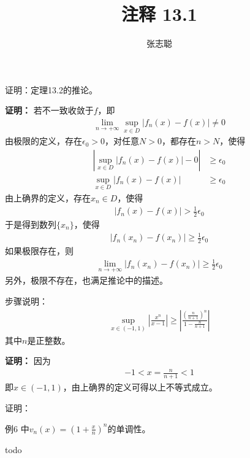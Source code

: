 \documentclass{article}
\begin{document}
\title{注释 13.1}
\author{张志聪}
\maketitle

\begin{zremark}
  证明：定理13.2的推论。
\end{zremark}
\textbf{证明：}
若不一致收敛于$f$，即
\begin{align*}
  \lim\limits_{n \to +\infty} \sup\limits_{x \in D} |f_n(x) - f(x)| \neq 0
\end{align*}
由极限的定义，存在$\epsilon_0 > 0$，对任意$N > 0$，都存在$n > N$，使得
\begin{align*}
  \left|\sup\limits_{x \in D} |f_n(x) - f(x)| - 0 \right| & \geq \epsilon_0 \\
  \sup\limits_{x \in D} |f_n(x) - f(x)|                   & \geq \epsilon_0
\end{align*}
由上确界的定义，存在$x_n \in D$，使得
\begin{align*}
  |f_n(x) - f(x)| > \frac{1}{2} \epsilon_0
\end{align*}
于是得到数列$\{x_n\}$，使得
\begin{align*}
  |f_n(x_n) - f(x_n)| \geq \frac{1}{2} \epsilon_0
\end{align*}
如果极限存在，则
\begin{align*}
  \lim\limits_{n \to +\infty} |f_n(x_n) - f(x_n)| \geq \frac{1}{2} \epsilon_0
\end{align*}
另外，极限不存在，也满足推论中的描述。

\begin{zremark}
  步骤说明：
  \begin{align*}
    \sup\limits_{x \in (-1, 1)} \left| \frac{x^n}{x - 1} \right|
    \geq \left| \frac{\left( \frac{n}{n+1} \right)^n}{1 - \frac{n}{n + 1}} \right|
  \end{align*}
  其中$n$是正整数。
\end{zremark}
\textbf{证明：}
因为
\begin{align*}
  -1 < x = \frac{n}{n+1} < 1
\end{align*}
即$x \in (-1, 1)$，由上确界的定义可得以上不等式成立。

\begin{zremark}
  证明：

  例6 中$v_n(x) = (1 + \frac{x}{n})^n$的单调性。
\end{zremark}
todo 
\end{document}
